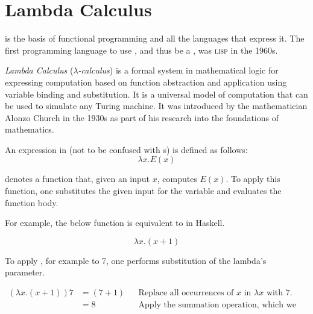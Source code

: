 \section{Lambda Calculus}\label{sec:Lambda_Calculus}
 is the basis of functional programming and all the languages that express it.
The first programming language to use , and thus be a , was \textsc{lisp} in the 1960s.

\begin{definition}\label{def:Lambda_Calculus}
  \emph{Lambda Calculus} (\emph{$\lambda$-calculus}) is a formal system in mathematical logic for expressing computation based on function abstraction and application using variable binding and substitution.
  It is a universal model of computation that can be used to simulate any Turing machine.
  It was introduced by the mathematician Alonzo Church in the 1930s as part of his research into the foundations of mathematics.
\end{definition}

An expression in  (not to be confused with s) is defined as follows:
\begin{equation}\label{eq:Basic_Lambda_Function}
  \lambda x. E(x)
\end{equation}

 denotes a function that, given an input $x$, computes $E(x)$.
To apply this function, one substitutes the given input for the variable and evaluates the function body.

For example, the below function is equivalent to  in Haskell.

\begin{equation}\label{eq:Succ_Lambda_Function}
  \lambda x.(x+1)
\end{equation}

To apply , for example to 7, one performs substitution of the lambda's parameter.

\begin{align*}
(\lambda x.(x+1))7 &= (7+1) && \text{Replace all occurrences of $x$ in $\lambda x$ with 7.} \\
                   &= 8 && \text{Apply the summation operation, which we assume to be primitive.} \\
\end{align*}

